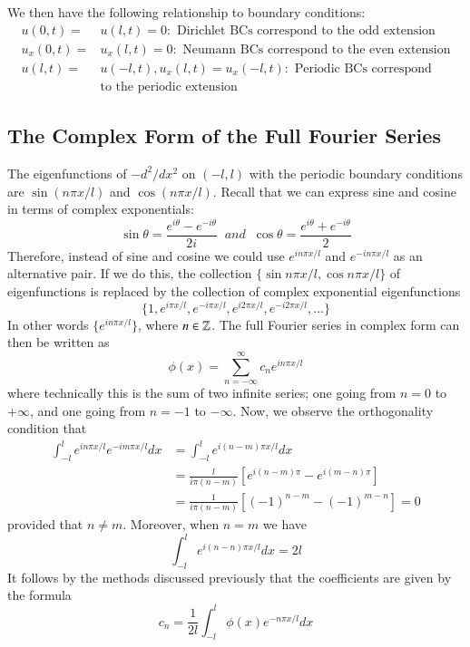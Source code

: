 We then have the following relationship to boundary conditions: \begin{align*}
    u(0,t) =&u(l,t)=0:\text{ Dirichlet BCs correspond to the odd extension} \\
    u_x(0,t)=&u_x(l,t)=0:\text{ Neumann BCs correspond to the even extension} \\
    u(l,t) =&u(-l,t),u_x(l,t) = u_x(-l,t):\text{ Periodic BCs correspond} \\
    &\text{to the periodic extension}
\end{align*}

\subsection{The Complex Form of the Full Fourier Series}

The eigenfunctions of $-d^2/dx^2$ on $(-l,l)$ with the periodic boundary conditions are $\sin(n\pi x/l)$ and $\cos(n\pi x/l)$. Recall that we can express sine and cosine in terms of complex exponentials: \begin{equation*}
    \sin\theta = \frac{e^{i\theta}-e^{-i\theta}}{2i}\;\;and\;\;\cos\theta = \frac{e^{i\theta}+e^{-i\theta}}{2}
\end{equation*}
Therefore, instead of sine and cosine we could use $e^{in\pi x/l}$ and $e^{-in\pi x/l}$ as an alternative pair. If we do this, the collection $\{\sin n\pi x/l,\cos n\pi x/l\}$ of eigenfunctions is replaced by the collection of complex exponential eigenfunctions \begin{equation*}
    \{1,e^{i\pi x/l},e^{-i\pi x/l},e^{i2\pi x/l},e^{-i2\pi x/l},...\}
\end{equation*}
In other words $\{e^{in\pi x/l}\}$, where $n \in \mathbb Z$. The full Fourier series in complex form can then be written as \begin{equation}
    \boxed{\phi(x) = \sum_{n=-\infty}^{\infty}c_ne^{in\pi x/l}}
\end{equation}
where technically this is the sum of two infinite series; one going from $n = 0$ to $+\infty$, and one going from $n = -1$ to $-\infty$. Now, we observe the orthogonality condition that \begin{align*}
    \int_{-l}^le^{in\pi x/l}e^{-im\pi x/l}dx &= \int_{-l}^le^{i(n-m)\pi x/l}dx \\
    &= \frac{l}{i\pi (n-m)}\left[e^{i(n-m)\pi} - e^{i(m-n)\pi}\right] \\
    &= \frac{1}{i\pi(n-m)}\left[(-1)^{n-m}-(-1)^{m-n}\right] = 0
\end{align*}
provided that $n \neq m$. Moreover, when $n = m$ we have \begin{equation*}
    \int_{-l}^le^{i(n-n)\pi x/l}dx = 2l
\end{equation*}
It follows by the methods discussed previously that the coefficients are given by the formula \begin{equation}
    \boxed{c_n = \frac{1}{2l}\int_{-l}^l\phi(x)e^{-n\pi x/l}dx}
\end{equation}


